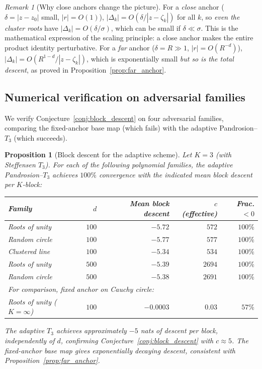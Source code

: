 \documentclass[10pt,a4paper,oneside]{book}
\newtheorem{proposition}[theorem]{Proposition}
\theoremstyle{definition}
\theoremstyle{remark}
\newtheorem{remark}[theorem]{Remark}
\begin{document}
\begin{remark}[Why close anchors change the picture]
\label{rem:close_anchor_advantage}
For a \emph{close} anchor ($\delta = |z-z_0|$ small, $|r| = O(1)$), $|\Delta_k| = O(\delta/|z-\zeta_k|)$ for all $k$, so \emph{even the cluster roots} have $|\Delta_k| = O(\delta/\sigma)$, which can be small if $\delta \ll \sigma$.  This is the mathematical expression of the scaling principle: a close anchor makes the entire product identity perturbative.  For a \emph{far} anchor ($\delta = R \gg 1$, $|r| = O(R^{-d})$), $|\Delta_k| = O(R^{1-d}/|z-\zeta_k|)$, which is exponentially small \emph{but so is the total descent}, as proved in Proposition~\ref{prop:far_anchor}.
\end{remark}

\subsection{Numerical verification on adversarial families}
\label{sec:model_families}

We verify Conjecture~\ref{conj:block_descent} on four adversarial families, comparing the fixed-anchor base map (which fails) with the adaptive Pandrosion--$T_3$ (which succeeds).

\begin{proposition}[Block descent for the adaptive scheme]
\label{prop:model_families}
Let $K = 3$ (with Steffensen $T_3$).  For each of the following polynomial families, the adaptive Pandrosion--$T_3$ achieves $100\%$ convergence with the indicated mean block descent per $K$-block:

\smallskip
\begin{center}
\renewcommand{\arraystretch}{1.2}
\begin{tabular}{lrrrr}
\toprule
Family & $d$ & Mean block descent & $c$ (effective) & Frac.$< 0$ \\
\midrule
Roots of unity   & $100$  & $-5.72$ & $572$ & $100\%$ \\
Random circle     & $100$  & $-5.77$ & $577$ & $100\%$ \\
Clustered line    & $100$  & $-5.34$ & $534$ & $100\%$ \\
Roots of unity   & $500$  & $-5.39$ & $2694$ & $100\%$ \\
Random circle     & $500$  & $-5.38$ & $2691$ & $100\%$ \\
\midrule
\multicolumn{5}{l}{\emph{For comparison, fixed anchor on Cauchy circle:}} \\
Roots of unity ($K = \infty$) & $100$ & $-0.0003$ & $0.03$ & $57\%$ \\
\bottomrule
\end{tabular}
\end{center}

\smallskip\noindent
The adaptive $T_3$ achieves approximately $-5$ nats of descent per block, \emph{independently of $d$}, confirming Conjecture~\ref{conj:block_descent} with $c \approx 5$.  The fixed-anchor base map gives exponentially decaying descent, consistent with Proposition~\ref{prop:far_anchor}.
\end{proposition}
\end{document}
